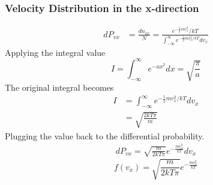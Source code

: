 \documentclass[letterpaper]{article}
\begin{document}
\subsubsection*{Velocity Distribution in the x-direction}
\begin{equation*}
    \begin{aligned}
        dP_{vx} &= \frac{dn_{vx}}{N} = \frac{e^{-\frac{1}{2}mv_x^2}/kT}{\int_{-\infty}^{\infty}
        e^{-\frac{1}{2}mv_x^2/kT}dv_x}
    \end{aligned}
\end{equation*}
Applying the integral value
\begin{equation*}
    I = \int_{-\infty}^{\infty}e^{-ax^2}dx=\sqrt{\frac{\pi}{a}}
\end{equation*}
The original integral becomes
\begin{equation*}
    \begin{aligned}
        I &= \int_{-\infty}^{\infty}e^{-\frac{1}{2}mv_x^2/kT}dv_x\\
        &= \sqrt{\frac{2kT\pi}{m}}
    \end{aligned}
\end{equation*}
Plugging the value back to the differential probability.
\begin{equation*}
    \begin{aligned}
        dP_{vx}=\sqrt{\frac{m}{2kT\pi}}e^{-\frac{mv_x^2}{kT}}dv_x
    \end{aligned}
\end{equation*}
\begin{equation*}
    f(v_x)=\sqrt{\frac{m}{2kT\pi}}e^{-\frac{mv_x^2}{kT}}
\end{equation*}
\end{document}
